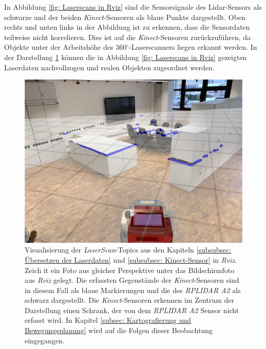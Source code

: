 		     	In Abbildung \ref{fig: Laserscans in Rviz} sind die Sensorsignale des Lidar-Sensors als schwarze und der beiden \textit{Kinect}-Sensoren als blaue Punkte dargestellt. Oben rechts und unten links in der Abbildung ist zu erkennen, dass die Sensordaten teilweise nicht korrelieren. Dies ist auf die \textit{Kinect}-Sensoren zurückzuführen, da Objekte unter der Arbeitshöhe des 360$^\circ$-Laserscanners liegen erkannt werden. In der Darstellung \ref{fig: Verifikation der erfassten Laserdaten} können die in Abbildung \ref{fig: Laserscans in Rviz} gezeigten Laserdaten nachvollzogen und realen Objekten zugeordnet werden.
		     	
		     	
		     	\begin{figure}[H]
		     		\centering
		     		\includegraphics[width=1.0\textwidth]{Bilder/match.pdf}
		     		\caption{Visualisierung der \textit{LaserScan}-Topics aus den Kapiteln \ref{subsubsec: Übersetzen der Laserdaten} und \ref{subsubsec: Kinect-Sensor} in \textit{Rviz}. Zeich it ein Foto aus gleicher Perspektive unter das Bildschirmfoto aus \textit{Rviz} gelegt. Die erfassten Gegenstände der \textit{Kinect}-Sensoren sind in diesem Fall als blaue Markierungen und die des \textit{RPLIDAR A2} als schwarz dargestellt. Die \textit{Kinect}-Sensoren erkennen im Zentrum der Darstellung einen Schrank, der von dem \textit{RPLIDAR A2} Sensor nicht erfasst wird. In Kapitel \ref{subsec: Kartografierung und Bewegungsplanung} wird auf die Folgen dieser Beobachtung eingegangen.}
		     		\label{fig: Verifikation der erfassten Laserdaten}
		     	\end{figure}
		     	
